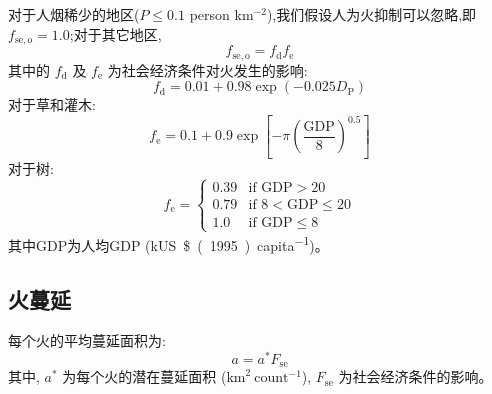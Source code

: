 对于人烟稀少的地区($P \leqslant 0.1$ person km$^{-2}$),我们假设人为火抑制可以忽略,即 $f_{\mathrm{se,o}} = 1.0$;对于其它地区,
\begin{equation}
  f_{\mathrm{se,o}} = f_{\mathrm {d}}  f_{\mathrm {e}}
\end{equation}
其中的 $f_{\mathrm {d}} $ 及 $f_{\mathrm {e}} $ 为社会经济条件对火发生的影响:
\begin{equation}
  f_{\mathrm {d}}  = 0.01 + 0.98\exp(-0.025 D_{\mathrm {P}} )
\end{equation}
对于草和灌木:
\begin{equation}
  f_{\mathrm {e}}  = 0.1 + 0.9\exp\left[-\pi \left(\frac{\text{GDP}}{8} \right)^{0.5} \right]
\end{equation}
%
对于树:
%
\begin{equation}
  f_{\mathrm {e}}  = \begin{cases}
    0.39 & \text{if GDP} > 20\\
    0.79 & \text{if } 8 < \text{GDP} \leqslant 20\\
    1.0 & \text{if GDP} \leqslant 8
  \end{cases}
\end{equation}
%
其中GDP为人均GDP (\unit{kUS\$(1995).capita^{-1}})。


\subsection{火蔓延}
每个火的平均蔓延面积为:
\begin{equation}
  a = a^* F_{\mathrm{se}}
\end{equation}
%
其中, $a^*$ 为每个火的潜在蔓延面积 ($\text{km}^2~\text{count}^{-1}$), $F_{\mathrm{se}}$ 为社会经济条件的影响。

